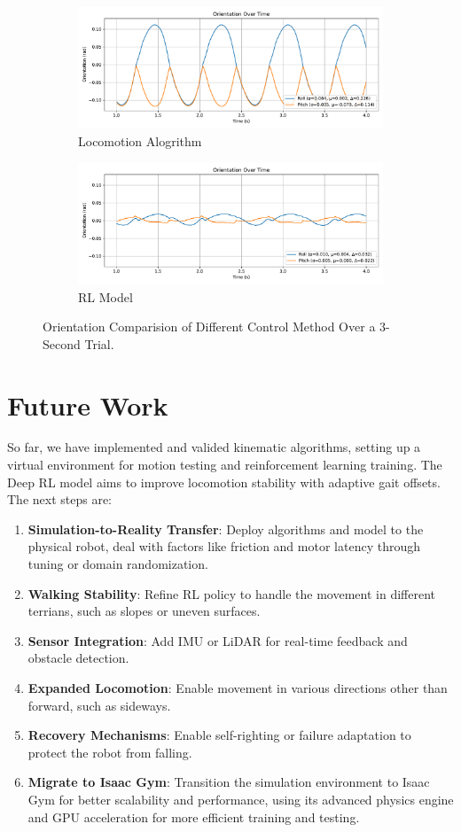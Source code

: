 \documentclass[a4paper,11pt]{article}
\begin{document}
\begin{figure}[H]
	\centering
	\begin{subfigure}[b]{\textwidth}
		\centering
		\includegraphics[width=0.7\linewidth]{../../assets/alg_ori.pdf}
		\caption{Locomotion Alogrithm}
	\end{subfigure}
	\vfill
	\begin{subfigure}[b]{\textwidth}
		\centering
		\includegraphics[width=0.7\linewidth]{../../assets/model_ori.pdf}
		\caption{RL Model}
	\end{subfigure}
	\caption{Orientation Comparision of Different Control Method Over a 3-Second Trial.}
	\label{fig:compare_ori}
\end{figure}

\section{Future Work}

So far, we have implemented and valided kinematic algorithms, 
setting up a virtual environment for motion testing and reinforcement 
learning training. The Deep RL model aims to improve locomotion stability with 
adaptive gait offsets. The next steps are:

\begin{enumerate}
	\item \textbf{Simulation-to-Reality Transfer}: Deploy algorithms and model to the physical robot, deal with factors like friction and motor latency through tuning or domain randomization.
	\item \textbf{Walking Stability}: Refine RL policy to handle the movement in different terrians, such as slopes or uneven surfaces.
	\item \textbf{Sensor Integration}: Add IMU or LiDAR for real-time feedback and obstacle detection.
	\item \textbf{Expanded Locomotion}: Enable movement in various directions other than forward, such as sideways.
	\item \textbf{Recovery Mechanisms}: Enable self-righting or failure adaptation to protect the robot from falling.
	\item \textbf{Migrate to Isaac Gym}: Transition the simulation environment to Isaac Gym for better scalability and performance, using its advanced physics engine and GPU acceleration for more efficient training and testing.
\end{enumerate}
\end{document}
